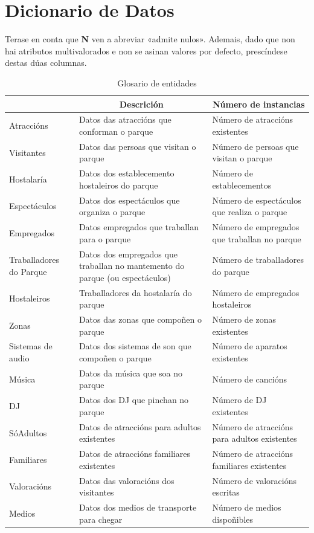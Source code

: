 \documentclass[12pt,a4paper]{book}
\theoremstyle{definition}
\theoremstyle{break}
\begin{document}
	\section{Dicionario de Datos}
	
	Terase en conta que \textbf{N} ven a abreviar «admite nulos». Ademais, dado que non hai atributos multivalorados e non se asinan valores por defecto, prescíndese destas dúas columnas.
	
	\begin{table} [H] \centering
		\caption{Glosario de entidades\\}
		\begin{tabular}{|m{2.5cm}|m{5.5cm}|m{5.5cm}|}
			\hline \rowcolor{gris}
			\multicolumn{1}{|c|}{Entidades} & \multicolumn{1}{c|}{Descrición} & \multicolumn{1}{c|}{Número de instancias} \\
			\hline
			Atraccións & Datos das atraccións que conforman o parque & Número de atraccións existentes \\
			\hline
			Visitantes & Datos das persoas que visitan o parque & Número de persoas que visitan o parque \\
			\hline
			Hostalaría & Datos dos establecemento hostaleiros do parque & Número de establecementos \\
			\hline
			Espectáculos & Datos dos espectáculos que organiza o parque & Número de espectáculos que realiza o parque \\
			\hline
			Empregados & Datos empregados que traballan para o parque & Número de empregados que traballan no parque \\
			\hline
			Traballadores do Parque & Datos dos empregados que traballan no mantemento do parque (ou espectáculos) & Número de traballadores do parque \\
			\hline
			Hostaleiros & Traballadores da hostalaría do parque & Número de empregados hostaleiros  \\
			\hline
			Zonas & Datos das zonas que  compoñen o parque & Número de zonas existentes\\
			\hline
			Sistemas de audio &  Datos dos sistemas de son que compoñen o parque & Número de aparatos existentes\\
			\hline
			Música &  Datos da música que soa no parque & Número de cancións\\
			\hline
			DJ &  Datos dos DJ que pinchan no parque & Número de DJ existentes\\
			\hline
			SóAdultos & Datos de atraccións para adultos existentes & Número de atraccións para adultos existentes \\
			\hline
			Familiares & Datos de atraccións familiares existentes & Número de atraccións  familiares existentes \\
			\hline
			Valoracións & Datos das valoracións dos visitantes & Número de valoracións escritas \\
			\hline
			Medios & Datos dos medios de transporte para chegar & Número de medios  dispoñibles \\
			\hline
		\end{tabular}
	\end{table}
	
\end{document}
